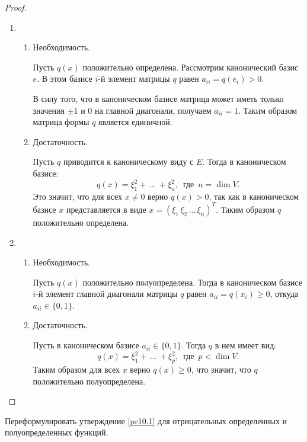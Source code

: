 \begin{proof}~
    \begin{enumerate}
        \item \begin{enumerate}
            \item Необходимость. 
            
            Пусть $q(x)$ положительно определена. Рассмотрим канонический базис $e$.
            В этом базисе $i$-й элемент матрицы $q$ равен $a_{ii} = q(e_i) > 0$. 
            
            В силу того, что в каноническом 
            базисе матрица может иметь только значения $\pm 1$ и $0$ на главной диагонали, получаем $a_{ii} = 1$.
            Таким образом матрица формы $q$ является единичной.
            \item Достаточность. 
            
            Пусть $q$ приводится к каноническому виду с $E$. Тогда в каноническом базисе: 
            $$q(x) = \xi_1^2 + \, \dots \,+ \xi_n^2, \, \text{ где } \, n = \dim V.$$ 
            Это значит, что для всех $x \neq 0$ верно $q(x) > 0$, так как в каноническом базисе 
            $x$ представляется в виде $x = (\xi_1 \, \xi_2 \, \dots \, \xi_n)^T$. Таким образом 
            $q$ положительно определена.
        \end{enumerate} 

        \item \begin{enumerate}
            \item Необходимость.
            
            Пусть $q(x)$ положительно полуопределена. Тогда в каноническом базисе $i$-й элемент 
            главной диагонали матрицы $q$ равен $a_{ii} = q(x_i) \geq 0$, 
            откуда $a_{ii} \in \{0, 1\}$.

            \item Достаточность.
            
            Пусть в каноническом базисе $a_{ii} \in \{ 0, 1\}$. Тогда $q$ в нем имеет вид:
            $$q(x) = \xi_1^2 + \, \dots \,+ \xi_p^2, \, \text{ где } \, p < \dim V.$$
            Таким образом для всех $x$ верно $q(x) \geq 0$, что значит, что $q$ положительно
            полуопределена.
        \end{enumerate}
    \end{enumerate}
\end{proof}

\begin{exercise}
    Переформулировать утверждение \ref{pr10.1} для отрицательных определенных и полуопределенных функций.
\end{exercise}

